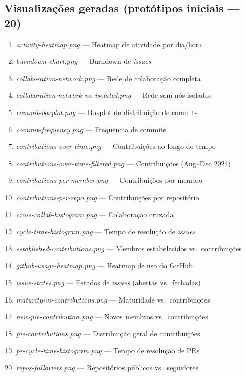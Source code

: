 \documentclass[
	12pt,
	openright,
	oneside,
	a4paper,
	brazil
]{abntex2}
\begin{document}
\begin{apendicesenv}
\section*{Visualizações geradas (protótipos iniciais --- 20)}
\begin{enumerate}
    \item \textit{activity-heatmap.png} --- Heatmap de atividade por dia/hora
    \item \textit{burndown-chart.png} --- Burndown de \textit{issues}
    \item \textit{collaboration-network.png} --- Rede de colaboração completa
    \item \textit{collaboration-network-no-isolated.png} --- Rede sem nós isolados
    \item \textit{commit-boxplot.png} --- Boxplot de distribuição de commits
    \item \textit{commit-frequency.png} --- Frequência de commits
    \item \textit{contributions-over-time.png} --- Contribuições ao longo do tempo
    \item \textit{contributions-over-time-filtered.png} --- Contribuições (Aug--Dec 2024)
    \item \textit{contributions-per-member.png} --- Contribuições por membro
    \item \textit{contributions-per-repo.png} --- Contribuições por repositório
    \item \textit{cross-collab-histogram.png} --- Colaboração cruzada
    \item \textit{cycle-time-histogram.png} --- Tempo de resolução de \textit{issues}
    \item \textit{established-contributions.png} --- Membros estabelecidos vs.\ contribuições
    \item \textit{github-usage-heatmap.png} --- Heatmap de uso do GitHub
    \item \textit{issue-states.png} --- Estados de \textit{issues} (abertas vs.\ fechadas)
    \item \textit{maturity-vs-contributions.png} --- Maturidade vs.\ contribuições
    \item \textit{new-pie-contribution.png} --- Novos membros vs.\ contribuições
    \item \textit{pie-contributions.png} --- Distribuição geral de contribuições
    \item \textit{pr-cycle-time-histogram.png} --- Tempo de resolução de PRs
    \item \textit{repos-followers.png} --- Repositórios públicos vs.\ seguidores
\end{enumerate}


\end{apendicesenv}
\end{document}
